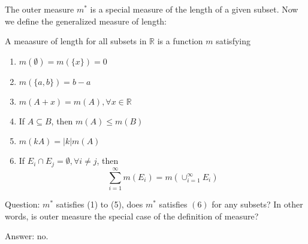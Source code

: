 The outer measure $m^*$ is a special measure of the length of a given subset. Now we define the generalized measure of length:
\begin{definition}[Measure]
A meaasure of length for all subsets in $\mathbb{R}$ is a function $m$ satisfying
\begin{enumerate}
\item
$m(\emptyset) = m(\{x\})=0$
\item
$m(\{a,b\}) = b-a$
\item
$m(A+x) = m(A),\forall x\in\mathbb{R}$
\item
If $A\subseteq B$, then $m(A)\le m(B)$
\item
$m(kA) = |k|m(A)$
\item
If $E_i\cap E_j = \emptyset,\forall i\ne j$, then 
\[
\sum_{i=1}^\infty m(E_i) = m(\cup_{i=1}^\infty E_i)
\]
\end{enumerate}
\end{definition}
Question: $m^*$ satisfies (1) to (5), does $m^*$ satisfies $(6)$ for any subsets? In other words, is outer measure the special case of the definition of measure?

Answer: no.









